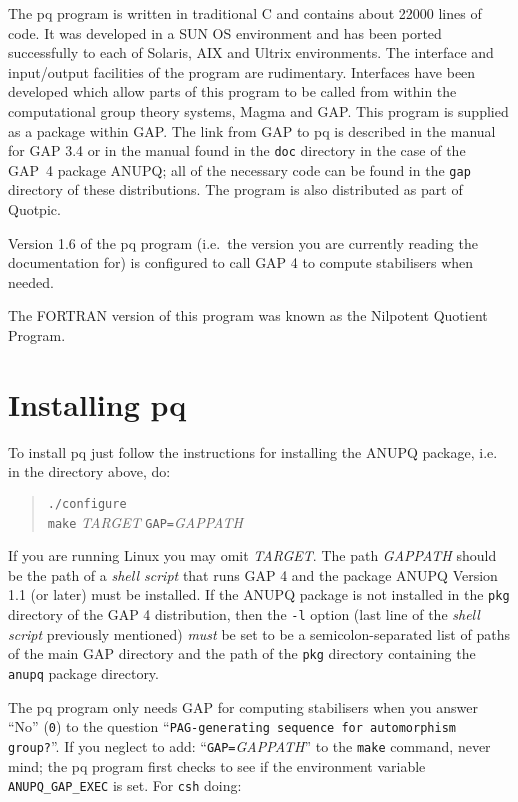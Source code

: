 \documentclass[12pt]{article}
\begin{document}
The pq program is written in traditional C and contains about 
22000 lines of code.
It was developed in a SUN OS environment and has been ported successfully
to each of Solaris, AIX and Ultrix environments.  The interface and 
input/output facilities of the program are rudimentary.  Interfaces 
have been developed which allow parts of this program to be called
from within the computational group theory systems, 
{\sc Magma} and {\sf GAP}.  
This program is supplied as a package within {\sf GAP}.
The link from {\sf GAP} to pq is described in the manual
for {\sf GAP} 3.4 or in the manual found in the \texttt{doc} directory
in the case of the {\sf GAP}~4 package {\sf ANUPQ}; all of the 
necessary code can be found in the \texttt{gap} directory of these 
distributions.
The program is also distributed as part of Quotpic.

Version 1.6 of the pq program (i.e.~the version you are currently reading
the documentation for) is configured to call {\sf GAP} 4 to compute
stabilisers when needed.

The FORTRAN version of this program was known as the 
Nilpotent Quotient Program.

\section{Installing pq}\label{sec:pq-install}

To install pq just follow the instructions for installing the {\sf ANUPQ}
package, i.e. in the directory above, do:

\begin{quote}
\verb|./configure|\\
\verb|make| \textit{TARGET} \verb|GAP=|\textit{GAPPATH}
\end{quote}

If you are running Linux you may omit \textit{TARGET}. The path 
\textit{GAPPATH} should be the path of a \emph{shell script} that runs
{\sf GAP} 4 and the package {\sf ANUPQ} Version 1.1 (or later)
must be installed. If the {\sf ANUPQ} package is not installed
in the \texttt{pkg} directory of the {\sf GAP} 4 distribution, then
the \texttt{-l} option (last line of the \emph{shell script} previously
mentioned) \emph{must} be set to be a semicolon-separated list of
paths of the main {\sf GAP} directory and the path of the \texttt{pkg}
directory containing the \texttt{anupq} package directory.

The pq program only needs {\sf GAP} for computing stabilisers when you
answer ``No'' (\texttt{0}) to the question 
``\texttt{PAG-generating sequence for automorphism group?}''.
If you neglect to add: ``\verb|GAP=|\textit{GAPPATH}'' to the \verb|make|
command, never mind; the pq program first checks to see if the environment
variable \verb|ANUPQ_GAP_EXEC| is set. For \texttt{csh} doing:
\end{document}
